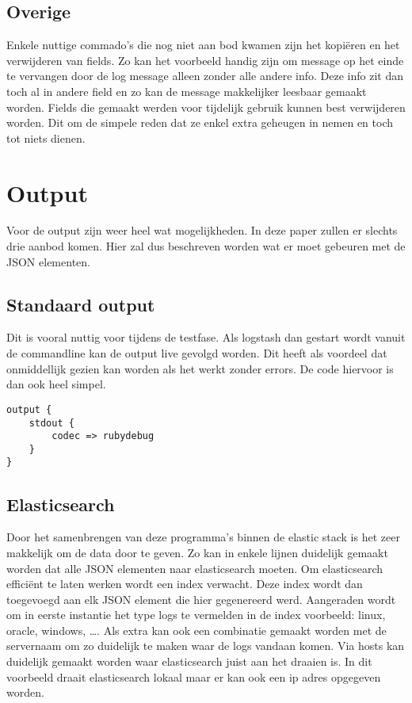 \subsection{Overige}
\label{subsec:overige}

Enkele nuttige commado’s die nog niet aan bod kwamen zijn het kopiëren en het verwijderen van fields. Zo kan het voorbeeld handig zijn om message op het einde te vervangen door de log message alleen zonder alle andere info. Deze info zit dan toch al in andere field en zo kan de message makkelijker leesbaar gemaakt worden. Fields die gemaakt werden voor tijdelijk gebruik kunnen best verwijderen worden. Dit om de simpele reden dat ze enkel extra geheugen in nemen en toch tot niets dienen.

\section{Output}
Voor de output zijn weer heel wat mogelijkheden. In deze paper zullen er slechts drie aanbod komen. Hier zal dus beschreven worden wat er moet gebeuren met de JSON elementen.


\subsection{Standaard output}
\label{subsec:standaardoutput}

Dit is vooral nuttig voor tijdens  de testfase. Als logstash dan gestart wordt vanuit de commandline kan de output live gevolgd worden. Dit heeft als voordeel dat onmiddellijk gezien kan worden als het werkt zonder errors. De code hiervoor is dan ook heel simpel.

\lstset{escapechar=@,style=customc}  
\begin{lstlisting}[frame=single]  
output {
	stdout {
		codec => rubydebug 
	}
}
\end{lstlisting}

\subsection{Elasticsearch}
\label{subsec:elasticsearch}

Door het samenbrengen van deze programma’s binnen de elastic stack is het zeer makkelijk om de data door te geven. Zo kan in enkele lijnen duidelijk gemaakt worden dat alle JSON elementen naar elasticsearch moeten. Om elasticsearch efficiënt te laten werken wordt een index verwacht. Deze index wordt dan toegevoegd aan elk JSON element die hier gegenereerd werd. Aangeraden wordt om in eerste instantie het type logs te vermelden in de index voorbeeld: linux, oracle, windows, \dots. Als extra kan ook een combinatie gemaakt worden met de servernaam om zo duidelijk te maken waar de logs vandaan komen. 
Via hosts kan duidelijk  gemaakt worden waar elasticsearch juist aan het draaien is. In dit voorbeeld draait elasticsearch lokaal maar er kan ook een ip adres opgegeven worden.

